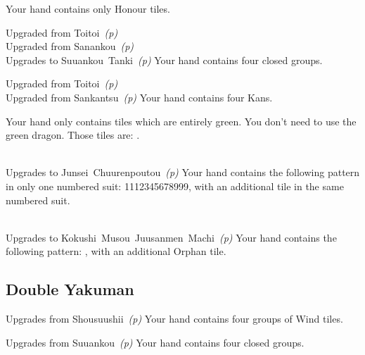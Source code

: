 	{}
	{Your hand contains only Honour tiles.}

	{\upgradesfrom Upgraded from Toitoi~\textit{(p\pageref{core:yaku:Toitoi})} \\
	\upgradesfrom Upgraded from Sanankou~\textit{(p\pageref{core:yaku:Sanankou})} \\
	\upgradesto Upgrades to Suuankou~Tanki~\textit{(p\pageref{core:yaku:Suuankou Tanki})}}
	{Your hand contains four closed groups.}

	{\upgradesfrom Upgraded from Toitoi~\textit{(p\pageref{core:yaku:Toitoi})} \\
	\upgradesfrom Upgraded from Sankantsu~\textit{(p\pageref{core:yaku:Sankantsu})}}
	{Your hand contains four Kans.}

	{}
	{Your hand only contains tiles which are entirely green. You don't need to use the green dragon. Those tiles are: {}.}

	{\closedhand \\
	\upgradesto Upgrades to Junsei~Chuurenpoutou~\textit{(p\pageref{core:yaku:Junsei Chuurenpoutou})}}
	{Your hand contains the following pattern in only one numbered suit: 1112345678999, with an additional tile in the same numbered suit.}

	{\closedhand \\
	\upgradesto Upgrades to Kokushi~Musou~Juusanmen~Machi~\textit{(p\pageref{core:yaku:Kokushi Musou Juusanmen Machi})}}
	{Your hand contains the following pattern: {}, with an additional Orphan tile.}


\subsection{Double Yakuman}\label{core:ssec:double-yakuman-yaku}

	{\upgradesfrom Upgrades from Shousuushii~\textit{(p\pageref{core:yaku:Shousuushii})}}
	{Your hand contains four groups of Wind tiles.}

	{\upgradesfrom Upgrades from Suuankou~\textit{(p\pageref{core:yaku:Suuankou})}}
	{Your hand contains four closed groups.}

